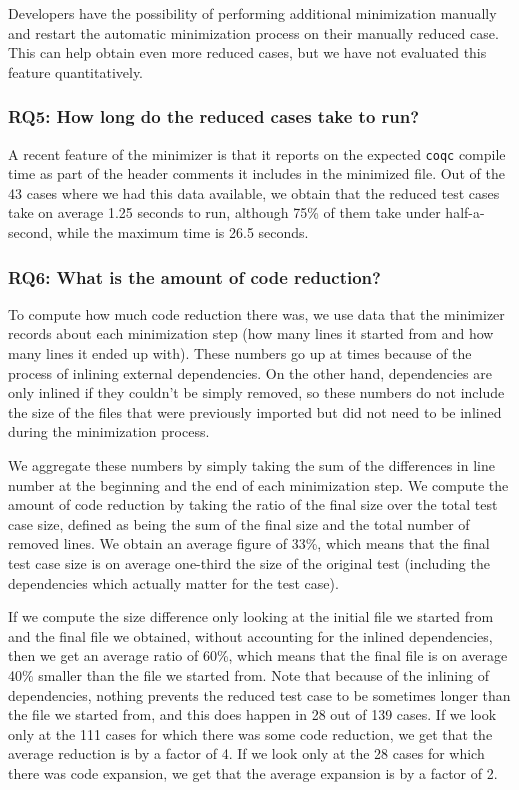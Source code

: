 \documentclass[a4paper,USenglish,cleveref,autoref,thm-restate]{lipics-v2021}
\begin{document}
Developers have the possibility of performing additional minimization manually and restart the automatic minimization process on their manually reduced case. This can help obtain even more reduced cases, but we have not evaluated this feature quantitatively.

\subsubsection{RQ5: How long do the reduced cases take to run?}

A recent feature of the minimizer is that it reports on the expected \texttt{coqc} compile time as part of the header comments it includes in the minimized file. Out of the 43 cases where we had this data available, we obtain that the reduced test cases take on average 1.25 seconds to run, although 75\% of them take under half-a-second, while the maximum time is 26.5 seconds.

\subsubsection{RQ6: What is the amount of code reduction?}

To compute how much code reduction there was, we use data that the minimizer records about each minimization step (how many lines it started from and how many lines it ended up with). These numbers go up at times because of the process of inlining external dependencies. On the other hand, dependencies are only inlined if they couldn't be simply removed, so these numbers do not include the size of the files that were previously imported but did not need to be inlined during the minimization process.

We aggregate these numbers by simply taking the sum of the differences in line number at the beginning and the end of each minimization step. We compute the amount of code reduction by taking the ratio of the final size over the total test case size, defined as being the sum of the final size and the total number of removed lines. We obtain an average figure of 33\%, which means that the final test case size is on average one-third the size of the original test (including the dependencies which actually matter for the test case).

If we compute the size difference only looking at the initial file we started from and the final file we obtained, without accounting for the inlined dependencies, then we get an average ratio of 60\%, which means that the final file is on average 40\% smaller than the file we started from. Note that because of the inlining of dependencies, nothing prevents the reduced test case to be sometimes longer than the file we started from, and this does happen in 28 out of 139 cases. If we look only at the 111 cases for which there was some code reduction, we get that the average reduction is by a factor of 4. If we look only at the 28 cases for which there was code expansion, we get that the average expansion is by a factor of 2.
\end{document}
